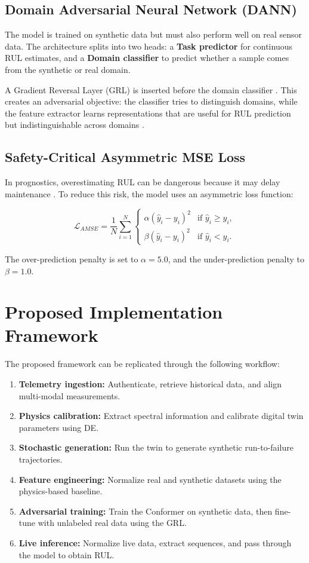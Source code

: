 \documentclass[journal,10pt,a4paper]{IEEEtran}
\begin{document}
\subsection{Domain Adversarial Neural Network (DANN)}
The model is trained on synthetic data but must also perform well on real sensor data. The architecture splits into two heads: a \textbf{Task predictor} for continuous RUL estimates, and a \textbf{Domain classifier} to predict whether a sample comes from the synthetic or real domain.

A Gradient Reversal Layer (GRL) is inserted before the domain classifier \cite{ganin2016domain}. This creates an adversarial objective: the classifier tries to distinguish domains, while the feature extractor learns representations that are useful for RUL prediction but indistinguishable across domains \cite{uda_phm,uda_benchmark_ieee}.

\subsection{Safety-Critical Asymmetric MSE Loss}
In prognostics, overestimating RUL can be dangerous because it may delay maintenance \cite{asymmetric_loss}. To reduce this risk, the model uses an asymmetric loss function:

\begin{equation}
\mathcal{L}_{AMSE} = \frac{1}{N}\sum_{i=1}^{N}
\begin{cases}
\alpha(\hat{y}_i - y_i)^2 & \text{if } \hat{y}_i \ge y_i, \\
\beta(\hat{y}_i - y_i)^2 & \text{if } \hat{y}_i < y_i.
\end{cases}
\end{equation}

The over-prediction penalty is set to $\alpha = 5.0$, and the under-prediction penalty to $\beta = 1.0$.

\section{Proposed Implementation Framework}
The proposed framework can be replicated through the following workflow:

\begin{enumerate}
    \item \textbf{Telemetry ingestion:} Authenticate, retrieve historical data, and align multi-modal measurements.
    \item \textbf{Physics calibration:} Extract spectral information and calibrate digital twin parameters using DE.
    \item \textbf{Stochastic generation:} Run the twin to generate synthetic run-to-failure trajectories.
    \item \textbf{Feature engineering:} Normalize real and synthetic datasets using the physics-based baseline.
    \item \textbf{Adversarial training:} Train the Conformer on synthetic data, then fine-tune with unlabeled real data using the GRL.
    \item \textbf{Live inference:} Normalize live data, extract sequences, and pass through the model to obtain RUL.
\end{enumerate}
\end{document}
